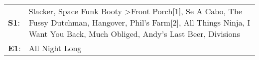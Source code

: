 \begin{supertabular}{p{0.03\textwidth}p{0.92\textwidth}}
 \textbf{S1}:  &  Slacker\textsuperscript{}, \enspace Space Funk Booty\textsuperscript{} \textgreater \enspace Front Porch[1]\textsuperscript{}, \enspace Se A Cabo\textsuperscript{}, \enspace The Fussy Dutchman\textsuperscript{}, \enspace Hangover\textsuperscript{}, \enspace Phil's Farm[2]\textsuperscript{}, \enspace All Things Ninja\textsuperscript{}, \enspace I Want You Back\textsuperscript{}, \enspace Much Obliged\textsuperscript{}, \enspace Andy's Last Beer\textsuperscript{}, \enspace Divisions\textsuperscript{}  \enspace  \\
 \textbf{E1}:  &                                                                                                                                                                                                                                                                                                                                                                                                                                                                                         All Night Long\textsuperscript{}  \enspace  \\
\end{supertabular}
